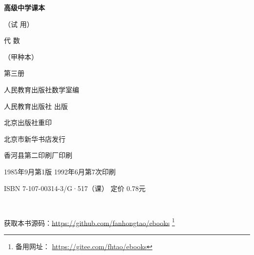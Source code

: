 \begin{titlepage}
    \begin{center}
        \vspace*{3cm}

        {\Large \textbf{高级中学课本} }

        {\Large（试 用）}

        \vspace{1cm}

        {\Huge 代 \qquad 数}

        \vspace{0.5cm}

        {\Large （甲种本）}

        {\Large 第三册}

        \vspace{1cm}
        {\Large 人民教育出版社数学室编}

        \vfill


        人民教育出版社 出版

        北京出版社重印

        北京市新华书店发行

        香河县第二印刷厂印刷

        1985年9月第1版  \qquad 1992年6月第7次印刷

        ISBN 7-107-00314-3/G·517（课） \quad 定价 0.78元

        \,

        获取本书源码：\url{https://github.com/fanhongtao/ebooks} \footnote{备用网址： \url{https://gitee.com/fhtao/ebooks} }
    \end{center}
 \end{titlepage}
